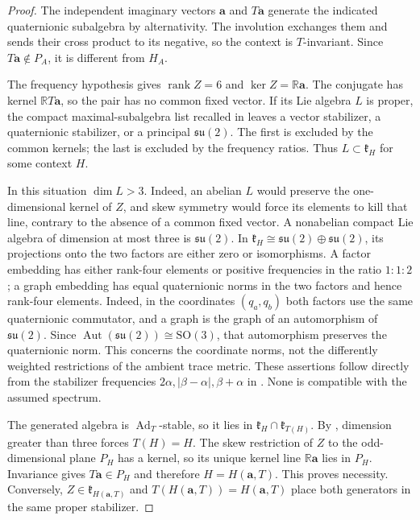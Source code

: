 \documentclass[11pt,a4paper]{article}
\newcommand{\RR}{\mathbb R}
\newcommand{\SO}{\mathrm{SO}}
\newcommand{\Aut}{\operatorname{Aut}}
\newcommand{\Ad}{\operatorname{Ad}}
\begin{document}
\begin{proof}
The independent imaginary vectors $\mathbf a$ and $T\mathbf a$ generate the indicated quaternionic subalgebra by alternativity.  The involution exchanges them and sends their cross product to its negative, so the context is $T$-invariant.  Since $T\mathbf a\notin P_A$, it is different from $H_A$.

The frequency hypothesis gives $\operatorname{rank}Z=6$ and $\ker Z=\RR \mathbf a$.  The conjugate has kernel $\RR T\mathbf a$, so the pair has no common fixed vector.  If its Lie algebra $L$ is proper, the compact maximal-subalgebra list recalled in  leaves a vector stabilizer, a quaternionic stabilizer, or a principal $\mathfrak{su}(2)$.  The first is excluded by the common kernels; the last is excluded by the frequency ratios.  Thus $L\subset\mathfrak k_H$ for some context $H$.

In this situation $\dim L>3$.  Indeed, an abelian $L$ would preserve the one-dimensional kernel of $Z$, and skew symmetry would force its elements to kill that line, contrary to the absence of a common fixed vector.  A nonabelian compact Lie algebra of dimension at most three is $\mathfrak{su}(2)$.  In $\mathfrak k_H\cong\mathfrak{su}(2)\oplus\mathfrak{su}(2)$, its projections onto the two factors are either zero or isomorphisms.  A factor embedding has either rank-four elements or positive frequencies in the ratio $1:1:2$; a graph embedding has equal quaternionic norms in the two factors and hence rank-four elements.  Indeed, in the coordinates $(q_a,q_b)$ both factors use the same quaternionic commutator, and a graph is the graph of an automorphism of $\mathfrak{su}(2)$.  Since $\Aut(\mathfrak{su}(2))\cong\SO(3)$, that automorphism preserves the quaternionic norm.  This concerns the coordinate norms, not the differently weighted restrictions of the ambient trace metric.  These assertions follow directly from the stabilizer frequencies $2\alpha,|\beta-\alpha|,\beta+\alpha$ in .  None is compatible with the assumed spectrum.

The generated algebra is $\Ad_T$-stable, so it lies in $\mathfrak k_H\cap\mathfrak k_{T(H)}$.  By , dimension greater than three forces $T(H)=H$.  The skew restriction of $Z$ to the odd-dimensional plane $P_H$ has a kernel, so its unique kernel line $\RR \mathbf a$ lies in $P_H$.  Invariance gives $T\mathbf a\in P_H$ and therefore $H=H(\mathbf a,T)$.  This proves necessity.  Conversely, $Z\in\mathfrak k_{H(\mathbf a,T)}$ and $T(H(\mathbf a,T))=H(\mathbf a,T)$ place both generators in the same proper stabilizer.


\end{proof}
\end{document}
